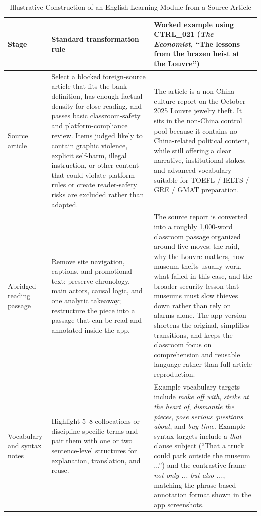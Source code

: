 \begin{table}[H]
\centering
\begin{threeparttable}
\caption{Illustrative Construction of an English-Learning Module from a Source Article}
\label{tab:module_construction}
\scriptsize
\setlength{\tabcolsep}{4pt}
\begin{tabularx}{\textwidth}{p{1.9cm}p{4.0cm}X}
\toprule
Stage & Standard transformation rule & Worked example using CTRL\_021 (\textit{The Economist}, ``The lessons from the brazen heist at the Louvre'') \\
\midrule
Source article & Select a blocked foreign-source article that fits the bank definition, has enough factual density for close reading, and passes basic classroom-safety and platform-compliance review. Items judged likely to contain graphic violence, explicit self-harm, illegal instruction, or other content that could violate platform rules or create reader-safety risks are excluded rather than adapted. & The article is a non-China culture report on the October 2025 Louvre jewelry theft. It sits in the non-China control pool because it contains no China-related political content, while still offering a clear narrative, institutional stakes, and advanced vocabulary suitable for TOEFL / IELTS / GRE / GMAT preparation. \\
\addlinespace
Abridged reading passage & Remove site navigation, captions, and promotional text; preserve chronology, main actors, causal logic, and one analytic takeaway; restructure the piece into a passage that can be read and annotated inside the app. & The source report is converted into a roughly 1,000-word classroom passage organized around five moves: the raid, why the Louvre matters, how museum thefts usually work, what failed in this case, and the broader security lesson that museums must slow thieves down rather than rely on alarms alone. The app version shortens the original, simplifies transitions, and keeps the classroom focus on comprehension and reusable language rather than full article reproduction. \\
\addlinespace
Vocabulary and syntax notes & Highlight 5--8 collocations or discipline-specific terms and pair them with one or two sentence-level structures for explanation, translation, and reuse. & Example vocabulary targets include \textit{make off with}, \textit{strike at the heart of}, \textit{dismantle the pieces}, \textit{pose serious questions about}, and \textit{buy time}. Example syntax targets include a \textit{that}-clause subject (``That a truck could park outside the museum ...'') and the contrastive frame \textit{not only ... but also ...}, matching the phrase-based annotation format shown in the app screenshots. \\

\end{tabularx}
\end{threeparttable}
\end{table}
